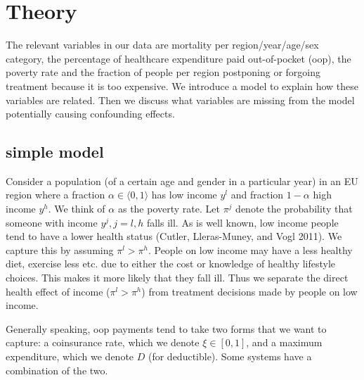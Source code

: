 \documentclass[a4paper,12pt]{article}
\makeatletter
\newcommand{\citeprocitem}[2]{\hyper@linkstart{cite}{citeproc_bib_item_#1}#2\hyper@linkend}
\makeatother
\begin{document}
\section{Theory}
\label{sec:orga30062d}

The relevant variables in our data are mortality per region/year/age/sex category, the percentage of healthcare expenditure paid out-of-pocket (oop), the poverty rate and the fraction of people per region postponing or forgoing treatment because it is too expensive. We introduce a model to explain how these variables are related. Then we discuss what variables are missing from the model potentially causing confounding effects.

\subsection{simple model}
\label{sec:org62fa947}

Consider a population (of a certain age and gender in a particular year) in an EU region where a fraction \(\alpha \in \langle 0,1 \rangle\) has low income \(y^l\) and fraction \(1-\alpha\) high income \(y^h\). We think of \(\alpha\) as the poverty rate. Let \(\pi^j\) denote the probability that someone with income \(y^j, j=l,h\) falls ill. As is well known, low income people tend to have a lower health status (\citeprocitem{9}{Cutler, Lleras-Muney, and Vogl 2011}). We capture this by assuming \(\pi^l > \pi^h\). People on low income may have a less healthy diet, exercise less etc. due to either the cost or knowledge of healthy lifestyle choices. This makes it more likely that they fall ill. Thus we separate the direct health effect of income (\(\pi^l > \pi^h\)) from treatment decisions made by people on low income.

Generally speaking, oop payments tend to take two forms that we want to capture: a coinsurance rate, which we denote \(\xi \in [0,1]\), and a maximum expenditure, which we denote \(D\) (for deductible). Some systems have a combination of the two.
\end{document}
